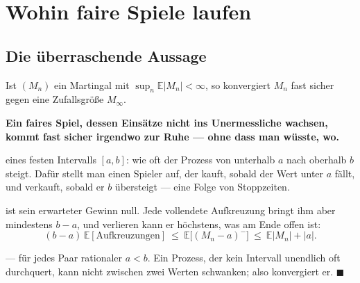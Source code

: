 \chapter{Wohin faire Spiele laufen}

\section{Die überraschende Aussage}

\begin{merksatz}
Ist $(M_n)$ ein Martingal mit $\sup_n \mathbb{E}|M_n| < \infty$, so konvergiert $M_n$ fast sicher gegen eine Zufallsgröße $M_\infty$.

\begin{center}
\begin{minipage}{0.9\textwidth}
\textbf{Ein faires Spiel, dessen Einsätze nicht ins Unermessliche wachsen, kommt fast sicher irgendwo zur Ruhe --- ohne dass man wüsste, wo.}
\end{minipage}
\end{center}

 eines festen Intervalls $[a,b]$: wie oft der Prozess von unterhalb $a$ nach oberhalb $b$ steigt. Dafür stellt man einen Spieler auf, der kauft, sobald der Wert unter $a$ fällt, und verkauft, sobald er $b$ übersteigt --- eine Folge von Stoppzeiten.

 ist sein erwarteter Gewinn null. Jede vollendete Aufkreuzung bringt ihm aber mindestens $b-a$, und verlieren kann er höchstens, was am Ende offen ist:
\[ (b-a)\,\mathbb{E}[\text{Aufkreuzungen}] \ \le\ \mathbb{E}\bigl[(M_n-a)^{-}\bigr] \ \le\ \mathbb{E}|M_n| + |a| . \]

 --- für jedes Paar rationaler $a < b$. Ein Prozess, der kein Intervall unendlich oft durchquert, kann nicht zwischen zwei Werten schwanken; also konvergiert er. $\blacksquare$

\begin{center}
\begin{minipage}{0.88\textwidth}
\end{minipage}
\end{center}
\end{merksatz}

